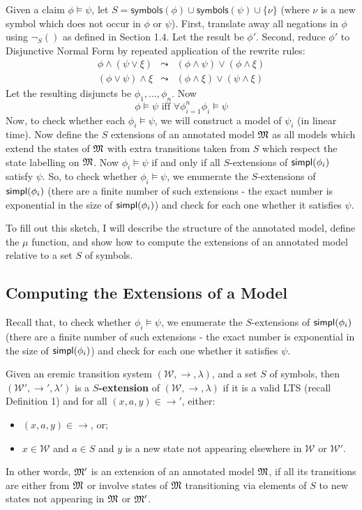 Given a claim $\phi \models \psi$, let $S = \mathsf{symbols}(\phi) \cup \mathsf{symbols}(\psi) \cup \{\nu\}$ (where $\nu$ is a new symbol which does not occur in $\phi$ or $\psi$).
First, translate away all negations in $\phi$ using $\neg_S()$ as defined in Section 1.4.
Let the result be $\phi'$.
Second, reduce $\phi'$ to Disjunctive Normal Form by repeated application of the rewrite rules:
\begin{eqnarray*}
\phi \land (\psi \lor \xi) & \leadsto & (\phi \land \psi) \lor (\phi \land \xi)  \\
(\phi \lor \psi) \land \xi & \leadsto & (\phi \land \xi) \lor (\psi \land \xi) 
\end{eqnarray*}
Let the resulting disjuncts be $\phi_1, ..., \phi_n$. 
Now 
\[
\phi \models \psi \mbox{ iff } \forall \phi_{i=1}^n \phi_i \models \psi
\]
Now, to check whether each $\phi_i \models \psi$, we will construct a model of $\psi_i$ (in linear time). 
Now define the $S$ extensions of an annotated model $\frak{M}$ as all models which extend the states of $\frak{M}$ with extra transitions taken from $S$ which respect the state labelling on $\frak{M}$.
Now $\phi_i \models \psi$ if and only if all $S$-extensions of $\mathsf{simpl}(\phi_i)$ satisfy $\psi$.
So, to check whether $\phi_i \models \psi$, we enumerate the $S$-extensions of $\mathsf{simpl}(\phi_i)$ (there are a finite number of such extensions - the exact number is exponential in the size of $\mathsf{simpl}(\phi_i)$) and check for each one whether it satisfies $\psi$.

To fill out this sketch, I will describe the structure of the annotated model, define the $\mu$ function, and show how to compute the extensions of an annotated model relative to a set $S$ of symbols.


\subsection{Computing the Extensions of a Model}

Recall that, to check whether $\phi_i \models \psi$, we enumerate the $S$-extensions of $\mathsf{simpl}(\phi_i)$ (there are a finite number of such extensions - the exact number is exponential in the size of $\mathsf{simpl}(\phi_i)$) and check for each one whether it satisfies $\psi$.

\begin{definition}
Given an eremic transition system $(\mathcal{W},\rightarrow,\lambda)$,  and a set $S$ of symbols, then $(\mathcal{W'},\rightarrow',\lambda')$ is a {\bf $S$-extension} of $(\mathcal{W},\rightarrow,\lambda)$ if it is a valid LTS (recall Definition 1) and for all $(x,a,y) \in \rightarrow'$, either:
\begin{itemize} 
\item
$(x, a, y) \in \rightarrow$,  or;
\item
 $x \in \mathcal{W}$ and $a \in S$ and $y$ is a new state not appearing elsewhere in $\mathcal{W}$ or $\mathcal{W'}$.
\end{itemize}
\end{definition}
In other words, $\frak{M}'$ is an extension of an annotated model $\frak{M}$, if all its transitions are either from $\frak{M}$ or involve states of $\frak{M}$ transitioning via elements of $S$ to new states not appearing in $\frak{M}$ or $\frak{M}'$.

